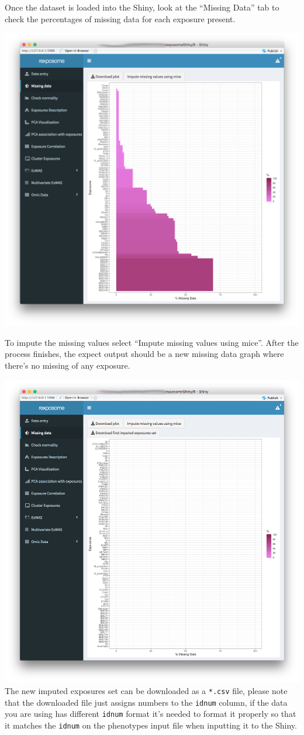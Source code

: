 \documentclass[
]{book}
\begin{document}
Once the dataset is loaded into the Shiny, look at the ``Missing Data'' tab to check the percentages of missing data for each exposure present.

\includegraphics{images/analysis2_2.png}

To impute the missing values select ``Impute missing values using mice''. After the process finishes, the expect output should be a new missing data graph where there's no missing of any exposure.

\includegraphics{images/analysis2_3.png}
The new imputed exposures set can be downloaded as a \texttt{*.csv} file, please note that the downloaded file just assigns numbers to the \texttt{idnum} column, if the data you are using has different \texttt{idnum} format it's needed to format it properly so that it matches the \texttt{idnum} on the phenotypes input file when inputting it to the Shiny.
\end{document}

